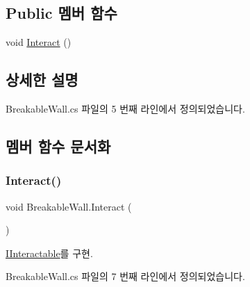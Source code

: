 \subsection*{Public 멤버 함수}
\begin{DoxyCompactItemize}
\item 
void \mbox{\hyperlink{class_breakable_wall_a73879db8dcfdfbc659cbb25a29886c11}{Interact}} ()
\end{DoxyCompactItemize}


\subsection{상세한 설명}


Breakable\+Wall.\+cs 파일의 5 번째 라인에서 정의되었습니다.



\subsection{멤버 함수 문서화}
\mbox{\label{class_breakable_wall_a73879db8dcfdfbc659cbb25a29886c11}} 
\subsubsection{\texorpdfstring{Interact()}{Interact()}}
{\footnotesize\ttfamily void Breakable\+Wall.\+Interact (\begin{DoxyParamCaption}{ }\end{DoxyParamCaption})}



\mbox{\hyperlink{interface_i_interactable_a6e8c9bc1f27bc2a5c81f674ceeac024c}{I\+Interactable}}를 구현.



Breakable\+Wall.\+cs 파일의 7 번째 라인에서 정의되었습니다.


